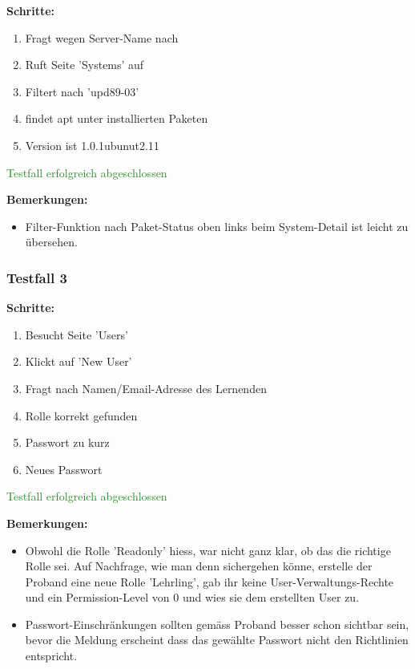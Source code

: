 \textbf{Schritte:}

\begin{enumerate}
    \item Fragt wegen Server-Name nach
    \item Ruft Seite 'Systems' auf
    \item Filtert nach 'upd89-03'
    \item findet apt unter installierten Paketen
    \item Version ist 1.0.1ubunut2.11
\end{enumerate}

\textcolor{ForestGreen}{Testfall erfolgreich abgeschlossen}

\bigskip
\textbf{Bemerkungen:}

\begin{itemize}[noitemsep,nolistsep]
    \item Filter-Funktion nach Paket-Status oben links beim System-Detail ist leicht zu übersehen.
\end{itemize}


\subsubsection*{Testfall 3}

\textbf{Schritte:}

\begin{enumerate}
    \item Besucht Seite 'Users'
    \item Klickt auf 'New User'
    \item Fragt nach Namen/Email-Adresse des Lernenden
    \item Rolle korrekt gefunden
    \item Passwort zu kurz
    \item Neues Passwort
\end{enumerate}

\textcolor{ForestGreen}{Testfall erfolgreich abgeschlossen}

\bigskip
\textbf{Bemerkungen:}

\begin{itemize}[noitemsep,nolistsep]
    \item Obwohl die Rolle 'Readonly' hiess, war nicht ganz klar, ob das die richtige Rolle sei. Auf Nachfrage, wie man denn sichergehen könne, erstelle der Proband eine neue Rolle 'Lehrling', gab ihr keine User-Verwaltungs-Rechte und ein Permission-Level von 0 und wies sie dem erstellten User zu.
    \item Passwort-Einschränkungen sollten gemäss Proband besser schon sichtbar sein, bevor die Meldung erscheint dass das gewählte Passwort nicht den Richtlinien entspricht.
\end{itemize}


